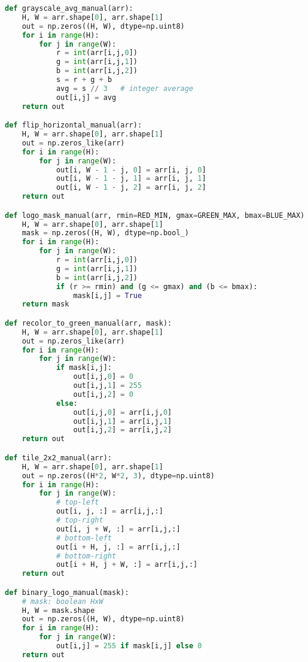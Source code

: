\documentclass[11pt,a4paper]{article}
\begin{document}
\begin{lstlisting}[language=Python, caption=Manual 2x2 tile snippet]
def grayscale_avg_manual(arr):
    H, W = arr.shape[0], arr.shape[1]
    out = np.zeros((H, W), dtype=np.uint8)
    for i in range(H):
        for j in range(W):
            r = int(arr[i,j,0])
            g = int(arr[i,j,1])
            b = int(arr[i,j,2])
            s = r + g + b
            avg = s // 3   # integer average
            out[i,j] = avg
    return out

def flip_horizontal_manual(arr):
    H, W = arr.shape[0], arr.shape[1]
    out = np.zeros_like(arr)
    for i in range(H):
        for j in range(W):
            out[i, W - 1 - j, 0] = arr[i, j, 0]
            out[i, W - 1 - j, 1] = arr[i, j, 1]
            out[i, W - 1 - j, 2] = arr[i, j, 2]
    return out

def logo_mask_manual(arr, rmin=RED_MIN, gmax=GREEN_MAX, bmax=BLUE_MAX):
    H, W = arr.shape[0], arr.shape[1]
    mask = np.zeros((H, W), dtype=np.bool_)
    for i in range(H):
        for j in range(W):
            r = int(arr[i,j,0])
            g = int(arr[i,j,1])
            b = int(arr[i,j,2])
            if (r >= rmin) and (g <= gmax) and (b <= bmax):
                mask[i,j] = True
    return mask

def recolor_to_green_manual(arr, mask):
    H, W = arr.shape[0], arr.shape[1]
    out = np.zeros_like(arr)
    for i in range(H):
        for j in range(W):
            if mask[i,j]:
                out[i,j,0] = 0
                out[i,j,1] = 255
                out[i,j,2] = 0
            else:
                out[i,j,0] = arr[i,j,0]
                out[i,j,1] = arr[i,j,1]
                out[i,j,2] = arr[i,j,2]
    return out

def tile_2x2_manual(arr):
    H, W = arr.shape[0], arr.shape[1]
    out = np.zeros((H*2, W*2, 3), dtype=np.uint8)
    for i in range(H):
        for j in range(W):
            # top-left
            out[i, j, :] = arr[i,j,:]
            # top-right
            out[i, j + W, :] = arr[i,j,:]
            # bottom-left
            out[i + H, j, :] = arr[i,j,:]
            # bottom-right
            out[i + H, j + W, :] = arr[i,j,:]
    return out

def binary_logo_manual(mask):
    # mask: boolean HxW
    H, W = mask.shape
    out = np.zeros((H, W), dtype=np.uint8)
    for i in range(H):
        for j in range(W):
            out[i,j] = 255 if mask[i,j] else 0
    return out


\end{lstlisting}
\end{document}

